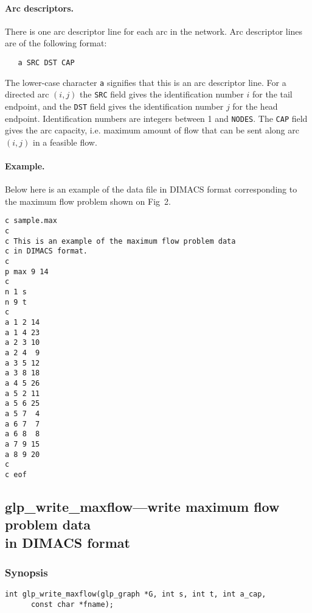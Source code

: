 \paragraph{Arc descriptors.} There is one arc descriptor line for each
arc in the network. Arc descriptor lines are of the following format:

\begin{verbatim}
   a SRC DST CAP
\end{verbatim}

\noindent
The lower-case character \verb|a| signifies that this is an arc
descriptor line. For a directed arc $(i,j)$ the \verb|SRC| field gives
the identification number $i$ for the tail endpoint, and the \verb|DST|
field gives the identification number $j$ for the head endpoint.
Identification numbers are integers between 1 and \verb|NODES|. The
\verb|CAP| field gives the arc capacity, i.e. maximum amount of flow
that can be sent along arc $(i,j)$ in a feasible flow.

\paragraph{Example.} Below here is an example of the data file in
DIMACS format corresponding to the maximum flow problem shown on Fig~2.

\newpage

\begin{footnotesize}
\begin{verbatim}
c sample.max
c
c This is an example of the maximum flow problem data
c in DIMACS format.
c
p max 9 14
c
n 1 s
n 9 t
c
a 1 2 14
a 1 4 23
a 2 3 10
a 2 4  9
a 3 5 12
a 3 8 18
a 4 5 26
a 5 2 11
a 5 6 25
a 5 7  4
a 6 7  7
a 6 8  8
a 7 9 15
a 8 9 20
c
c eof
\end{verbatim}
\end{footnotesize}

\subsection{glp\_write\_maxflow---write maximum flow problem data\\
in DIMACS format}

\subsubsection*{Synopsis}

\begin{verbatim}
int glp_write_maxflow(glp_graph *G, int s, int t, int a_cap,
      const char *fname);
\end{verbatim}

